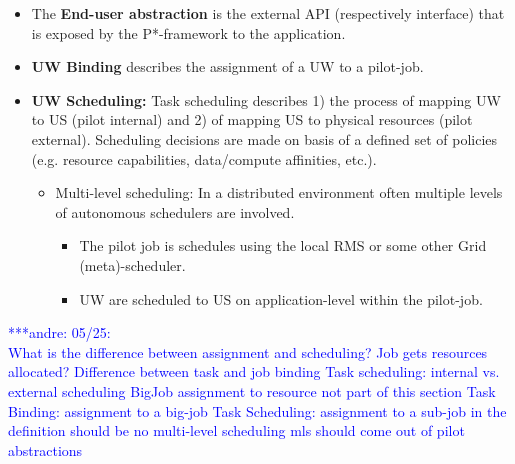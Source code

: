 \documentclass[conference,final]{IEEEtran}
\newcommand{\alnote}[1]{ {\textcolor{blue} { ***andre: #1 }}}
\newcommand{\alnote}[1]{}
\begin{document}
\begin{itemize}
	\item The \textbf{End-user abstraction} is the external API (respectively 
	interface) that is exposed by the P*-framework to the application.
	\item \textbf{UW Binding} describes the assignment of a UW to a pilot-job.
	\item \textbf{UW Scheduling:} Task scheduling describes 1) the process of  
	mapping UW to US (pilot internal) and 2) of mapping US to physical 
	resources (pilot external). Scheduling decisions are made on basis of a 
	defined set of policies (e.g. resource capabilities, data/compute 
	affinities, etc.).
	\begin{itemize}
	 			\item Multi-level scheduling: In a distributed environment often multiple levels of autonomous schedulers are involved. 
	 			\begin{itemize}	 			  
	 			   \item The pilot job is schedules using the local RMS or some 
	 			   other Grid (meta)-scheduler.
	 			   \item UW are scheduled to US on application-level within the 
	 			   pilot-job.
	 			\end{itemize}
	\end{itemize}
\end{itemize}
	\alnote{05/25:\\
	What is the difference between assignment and scheduling? Job gets
	resources allocated? 
	Difference between task and job binding
	Task scheduling: internal vs. external scheduling
	BigJob assignment to resource not part of this section
	Task Binding: assignment to a big-job
	Task Scheduling: assignment to a sub-job	
	in the definition should be no multi-level scheduling
    mls should come out of pilot abstractions
}
	
\end{document}
